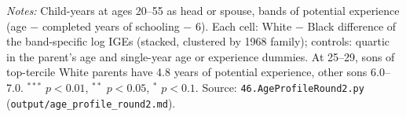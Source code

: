 \begin{table}[!htbp]
{{\begin{tabular}{lcccccc}
\bottomrule
\end{tabular}}}
\par\smallskip
\begin{minipage}{\textwidth}\footnotesize \textit{Notes:} Child-years at ages 20--55 as head or spouse, bands of potential experience (age $-$ completed years of schooling $-$ 6). Each cell: White $-$ Black difference of the band-specific log IGEs (stacked, clustered by 1968 family); controls: quartic in the parent's age and single-year age or experience dummies. At 25--29, sons of top-tercile White parents have 4.8 years of potential experience, other sons 6.0--7.0. $^{***}$ $p<0.01$, $^{**}$ $p<0.05$, $^{*}$ $p<0.1$. Source: \texttt{46.AgeProfileRound2.py} (\texttt{output/age\_profile\_round2.md}).\end{minipage}
\end{table}
